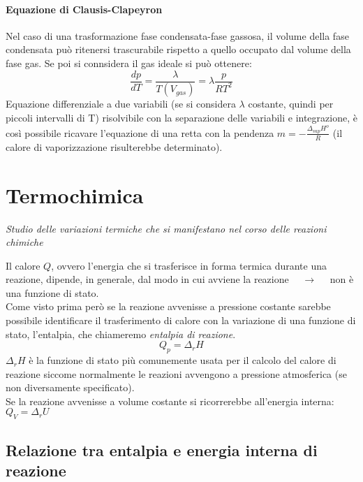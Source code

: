 \documentclass{article}
\newcommand{\so}{\quad \rightarrow \quad}
\newcommand{\ce}[1]{\begin{center}\textit{#1}\end{center}}
\begin{document}
\paragraph{Equazione di Clausis-Clapeyron}
Nel caso di una trasformazione fase condensata-fase gassosa, il volume della fase condensata può ritenersi trascurabile rispetto a quello occupato dal volume della fase gas. Se poi si connsidera il gas ideale si può ottenere:
\begin{equation*}
    \frac{dp}{dT}=\frac{\lambda}{T(V_{gas})}=\lambda\frac{p}{RT^2}
\end{equation*}
Equazione differenziale a due variabili (se si considera $\lambda$ costante, quindi per piccoli intervalli di T) risolvibile con la separazione delle variabili e integrazione, è così possibile ricavare l'equazione di una retta con la pendenza $m=-\frac{\Delta_{vap}H^o}{R}$ (il calore di vaporizzazione risulterebbe determinato).




\section{Termochimica}
\ce{Studio delle variazioni termiche che si manifestano nel corso delle reazioni chimiche}
Il calore $Q$, ovvero l'energia che si trasferisce in forma termica durante una reazione, dipende, in generale, dal modo in cui avviene la reazione $\so$ non è una funzione di stato. \\
Come visto prima però se la reazione avvenisse a pressione costante sarebbe possibile identificare il trasferimento di calore con la variazione di una funzione di stato, l'entalpia, che chiameremo \textit{entalpia di reazione}.
\begin{equation*}
    Q_p=\Delta_rH
\end{equation*}
$\Delta_rH$ è la funzione di stato più comunemente usata per il calcolo del calore di reazione siccome normalmente le reazioni avvengono a pressione atmosferica (se non diversamente specificato). \\
Se la reazione avvenisse a volume costante si ricorrerebbe all'energia interna: $Q_V=\Delta_rU$

\subsection{Relazione tra entalpia e energia interna di reazione}
\end{document}
